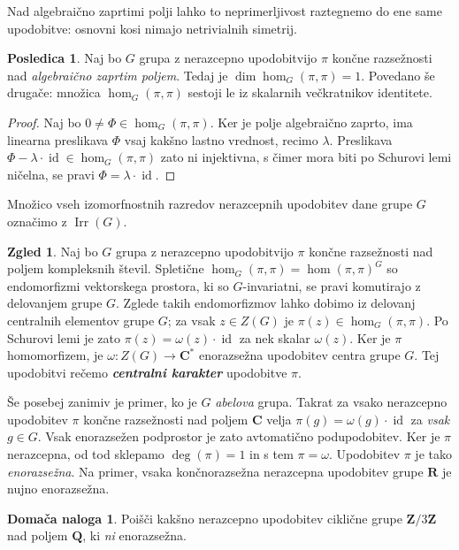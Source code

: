 \documentclass[11pt]{book}
\def\ZZ{\mathbf{Z}}
\def\QQ{\mathbf{Q}}
\def\RR{\mathbf{R}}
\def\CC{\mathbf{C}}
\DeclareMathOperator\Irr{Irr}
\DeclareMathOperator\id{id}
\def\definicija{\color{rdeca}\bf\em}
\theoremstyle{definition}
\theoremstyle{zgled}
\newtheorem*{zgled}{Zgled}
\theoremstyle{odprtproblem}
\theoremstyle{domacanaloga}
\newtheorem*{domacanaloga}{Domača naloga}
\newenvironment{dokaz}
    {\color{siva}\begin{proof}}
    {\end{proof}}
\theoremstyle{izrek}
\newtheorem*{posledica}{Posledica}
\begin{document}
Nad algebraično zaprtimi polji lahko to neprimerljivost raztegnemo do ene same upodobitve: osnovni kosi nimajo netrivialnih simetrij.

\begin{posledica}
Naj bo $G$ grupa z nerazcepno upodobitvijo $\pi$ končne razsežnosti nad \emph{algebraično zaprtim poljem}. Tedaj je $\dim \hom_G(\pi, \pi) = 1$. Povedano še drugače: množica $\hom_G(\pi, \pi)$ sestoji le iz skalarnih večkratnikov identitete.
\end{posledica}
\begin{dokaz}
Naj bo $0 \neq \Phi \in \hom_G(\pi, \pi)$. Ker je polje algebraično zaprto, ima linearna preslikava $\Phi$ vsaj kakšno lastno vrednost, recimo $\lambda$. Preslikava $\Phi - \lambda \cdot \id \in \hom_G(\pi, \pi)$ zato ni injektivna, s čimer mora biti po Schurovi lemi ničelna, se pravi $\Phi = \lambda \cdot \id$.
\end{dokaz}

Množico vseh izomorfnostnih razredov nerazcepnih upodobitev dane grupe $G$ označimo z $\Irr(G)$.

\begin{zgled}
Naj bo $G$ grupa z nerazcepno upodobitvijo $\pi$ končne razsežnosti nad poljem kompleksnih števil. Spletične $\hom_G(\pi, \pi) = \hom(\pi, \pi)^G$ so endomorfizmi vektorskega prostora, ki so $G$-invariatni, se pravi komutirajo z delovanjem grupe $G$. Zglede takih endomorfizmov lahko dobimo iz delovanj centralnih elementov grupe $G$; za vsak $z \in Z(G)$ je $\pi(z) \in \hom_G(\pi, \pi)$. Po Schurovi lemi je zato $\pi(z) = \omega(z) \cdot \id$ za nek skalar $\omega(z)$. Ker je $\pi$ homomorfizem, je $\omega \colon Z(G) \to \CC^*$ enorazsežna upodobitev centra grupe $G$. Tej upodobitvi rečemo {\definicija centralni karakter} upodobitve $\pi$.

Še posebej zanimiv je primer, ko je $G$ \emph{abelova} grupa. Takrat za vsako nerazcepno upodobitev $\pi$ končne razsežnosti nad poljem $\CC$ velja $\pi(g) = \omega(g) \cdot \id$ za \emph{vsak} $g \in G$.  Vsak enorazsežen podprostor je zato avtomatično podupodobitev. Ker je $\pi$ nerazcepna, od tod sklepamo $\deg(\pi) = 1$ in s tem $\pi = \omega$. Upodobitev $\pi$ je tako \emph{enorazsežna}. Na primer, vsaka končnorazsežna nerazcepna upodobitev grupe $\RR$ je nujno enorazsežna.
\end{zgled}

\begin{domacanaloga}
Poišči kakšno nerazcepno upodobitev ciklične grupe $\ZZ/3\ZZ$ nad poljem $\QQ$, ki \emph{ni} enorazsežna.
\end{domacanaloga}
\end{document}

